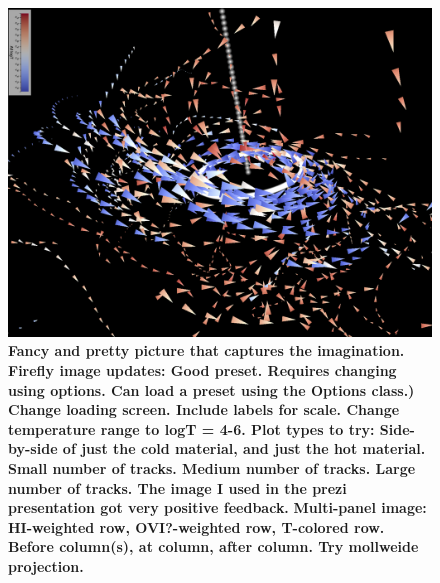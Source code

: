 \documentclass[fleqn,usenatbib]{mnras}
\begin{document}
\begin{figure}
    \centering
    \includegraphics[width=\textwidth]{figures/firefly_m12i_md.png}
    \caption{
    \textbf{Fancy and pretty picture that captures the imagination.}
    \textbf{
    Firefly image updates:
Good preset. Requires changing using options. Can load a preset using the Options class.)
Change loading screen.
Include labels for scale.
Change temperature range to logT = 4-6.
Plot types to try:
Side-by-side of just the cold material, and just the hot material.
Small number of tracks.
Medium number of tracks.
Large number of tracks.
The image I used in the prezi presentation got very positive feedback.
}
    \textbf{
    Multi-panel image:
    HI-weighted row,
    OVI?-weighted row,
    T-colored row.
    Before column(s), at column, after column.
    Try mollweide projection.
    }
    }
    \label{f: overview}
\end{figure}
\end{document}
